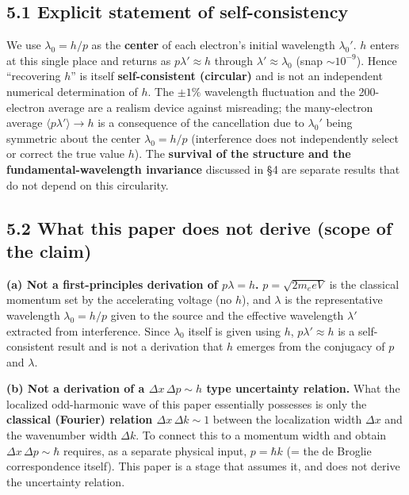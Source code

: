 \documentclass[11pt,a4paper]{article}
\begin{document}
\subsection{5.1 Explicit statement of
self-consistency}\label{explicit-statement-of-self-consistency}

We use \(\lambda_0=h/p\) as the \textbf{center} of each electron's
initial wavelength \(\lambda_0'\). \(h\) enters at this single place and
returns as \(p\lambda'\approx h\) through \(\lambda'\approx\lambda_0\)
(snap \(\sim10^{-9}\)). Hence ``recovering \(h\)'' is itself
\textbf{self-consistent (circular)} and is not an independent numerical
determination of \(h\). The \(\pm1\%\) wavelength fluctuation and the
200-electron average are a realism device against misreading; the
many-electron average \(\langle p\lambda'\rangle\to h\) is a consequence
of the cancellation due to \(\lambda_0'\) being symmetric about the
center \(\lambda_0=h/p\) (interference does not independently select or
correct the true value \(h\)). The \textbf{survival of the structure and
the fundamental-wavelength invariance} discussed in §4 are separate
results that do not depend on this circularity.

\subsection{5.2 What this paper does not derive (scope of the
claim)}\label{what-this-paper-does-not-derive-scope-of-the-claim}

\textbf{(a) Not a first-principles derivation of \(p\lambda=h\).}
\(p=\sqrt{2m_eeV}\) is the classical momentum set by the accelerating
voltage (no \(h\)), and \(\lambda\) is the representative wavelength
\(\lambda_0=h/p\) given to the source and the effective wavelength
\(\lambda'\) extracted from interference. Since \(\lambda_0\) itself is
given using \(h\), \(p\lambda'\approx h\) is a self-consistent result
and is not a derivation that \(h\) emerges from the conjugacy of \(p\)
and \(\lambda\).

\textbf{(b) Not a derivation of a \(\Delta x\,\Delta p\sim h\) type
uncertainty relation.} What the localized odd-harmonic wave of this
paper essentially possesses is only the \textbf{classical (Fourier)
relation \(\Delta x\,\Delta k\sim1\)} between the localization width
\(\Delta x\) and the wavenumber width \(\Delta k\). To connect this to a
momentum width and obtain \(\Delta x\,\Delta p\sim\hbar\) requires, as a
separate physical input, \(p=\hbar k\) (= the de Broglie correspondence
itself). This paper is a stage that assumes it, and does not derive the
uncertainty relation.
\end{document}
